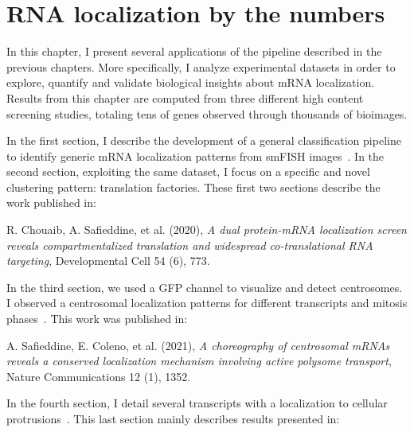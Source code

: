 
\graphicspath{{./figures/chapter5/}}

\chapter{RNA localization by the numbers}
\label{ch:chapter5}


\newpage
\minitoc
\newpage

In this chapter, I present several applications of the pipeline described in the previous chapters.
More specifically, I analyze experimental datasets in order to explore, quantify and validate biological insights about \ac{mRNA} localization.
Results from this chapter are computed from three different high content screening studies, totaling tens of genes observed through thousands of bioimages.

In the first section, I describe the development of a general classification pipeline to identify generic \ac{mRNA} localization patterns from \ac{smFISH} images~\cite{CHOUAIB_2020}.
In the second section, exploiting the same dataset, I focus on a specific and novel clustering pattern: translation factories.
These first two sections describe the work published in:

\begin{center}
	\color{green}
	R. Chouaib, A. Safieddine, et al. (2020), \textit{A dual protein-mRNA localization screen reveals compartmentalized translation and widespread co-translational RNA targeting}, Developmental Cell 54 (6), 773.
\end{center}

In the third section, we used a \ac{GFP} channel to visualize and detect centrosomes.
I observed a centrosomal localization patterns for different transcripts and mitosis phases~\cite{safieddine_choreography_2021}.
This work was published in:

\begin{center}
	\color{green}
	A. Safieddine, E. Coleno, et al. (2021), \textit{A choreography of centrosomal mRNAs reveals a conserved localization mechanism involving active polysome transport}, Nature Communications 12 (1), 1352.
\end{center}

In the fourth section, I detail several transcripts with a localization to cellular protrusions~\cite{pichon_kinesin_2021}.
This last section mainly describes results presented in:

